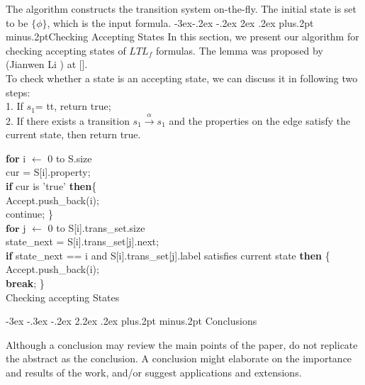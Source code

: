 \documentclass[twoside]{article}
\makeatletter
\def\section{\@startsection{section}{1}{\z@}%
 {-3ex \@plus -.3ex \@minus -.2ex}%
 {2.2ex \@plus.2ex}%
{\normalfont\normalsize\protect\baselineskip=14.5pt plus.2pt minus.2pt\bfseries}}
\def\subsection{\@startsection{subsection}{2}{\z@}%
 {-3ex\@plus -.2ex \@minus -.2ex}%
 {2ex \@plus.2ex}%
{\normalfont\normalsize\protect\baselineskip=12.5pt plus.2pt minus.2pt\bfseries}}
\makeatother
\begin{document}
\begin{multicols}{2}
The algorithm constructs the transition system on-the-fly. The initial state is set to be $\{\phi\}$, which is the input formula. 
\subsection{Checking Accepting States}  
In this section, we present our algorithm for checking accepting states of $LTL_f$ formulas. The lemma  was proposed by (Jianwen Li ) at [].  \\


To check whether a state is an accepting state, we can  discuss it in following two steps: \\
1. If $s_1 $= tt, return true; \\
2. If there exists a transition  $ s_1 \overset{\alpha}{\rightarrow}s_1$ and  the properties on the edge satisfy the current state, then return true. \\

\IncMargin{1em}
 \begin{algorithm}[H]
    \SetAlgoNoLine
    \BlankLine
\textbf{for} i $\leftarrow$  0 to S.size  \\
\qquad cur = S[i].property;  \\
\qquad  \textbf{if} cur is 'true'   \textbf{then}\{      \\
\qquad \quad Accept.push\_back(i);     \\
\qquad \quad  continue;  \}     \\
\qquad  $ \textbf{for}$ j $\leftarrow$  0 to S[i].trans\_set.size \\
\qquad \quad state\_next = S[i].trans\_set[j].next;  \\
\qquad \quad \textbf{if} state\_next == i and S[i].trans\_set[j].label satisfies current state \textbf{then} \{  \\
\qquad \qquad Accept.push\_back(i);  \\
\qquad \qquad \textbf{break}; \} \\
 \caption{Checking accepting States}
\end{algorithm}

\section{ Conclusions}

Although a conclusion may review the main points of the paper, do not replicate the abstract as the conclusion. A conclusion might elaborate on the importance and results of the work, and/or suggest applications and extensions.


\end{multicols}
\end{document}
